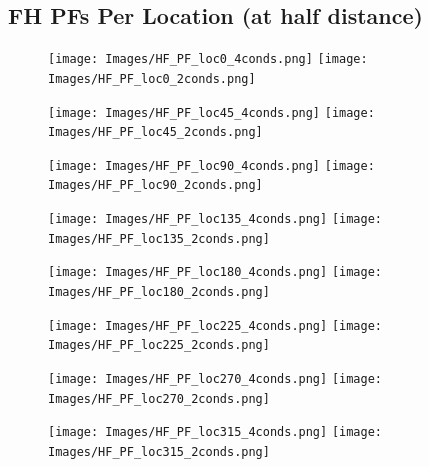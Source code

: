 \documentclass[11pt]{article} %
\begin{document}
\subsection{FH PFs Per Location (at half distance)}
\begin{figure}[H]
\centering %
\texttt{[image: Images/HF\_PF\_loc0\_4conds.png]}
\texttt{[image: Images/HF\_PF\_loc0\_2conds.png]}
\end{figure}
\begin{figure}[H]
\centering %
\texttt{[image: Images/HF\_PF\_loc45\_4conds.png]}
\texttt{[image: Images/HF\_PF\_loc45\_2conds.png]}
\end{figure}
\begin{figure}[H]
\centering %
\texttt{[image: Images/HF\_PF\_loc90\_4conds.png]}
\texttt{[image: Images/HF\_PF\_loc90\_2conds.png]}
\end{figure}
\begin{figure}[H]
\centering %
\texttt{[image: Images/HF\_PF\_loc135\_4conds.png]}
\texttt{[image: Images/HF\_PF\_loc135\_2conds.png]}
\end{figure}
\begin{figure}[H]
\centering %
\texttt{[image: Images/HF\_PF\_loc180\_4conds.png]}
\texttt{[image: Images/HF\_PF\_loc180\_2conds.png]}
\end{figure}
\begin{figure}[H]
\centering %
\texttt{[image: Images/HF\_PF\_loc225\_4conds.png]}
\texttt{[image: Images/HF\_PF\_loc225\_2conds.png]}
\end{figure}
\begin{figure}[H]
\centering %
\texttt{[image: Images/HF\_PF\_loc270\_4conds.png]}
\texttt{[image: Images/HF\_PF\_loc270\_2conds.png]}
\end{figure}
\begin{figure}[H]
\centering %
\texttt{[image: Images/HF\_PF\_loc315\_4conds.png]}
\texttt{[image: Images/HF\_PF\_loc315\_2conds.png]}
\end{figure}


\newpage
\end{document}
